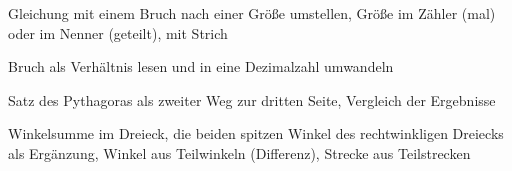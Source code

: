 \begin{aufgabe}{Gleichung mit einem Bruch nach einer Größe umstellen, Größe im Zähler (mal) oder im Nenner (geteilt), mit Strich}
\end{aufgabe}

\begin{aufgabe}{Bruch als Verhältnis lesen und in eine Dezimalzahl umwandeln}
\end{aufgabe}

\begin{aufgabe}{Satz des Pythagoras als zweiter Weg zur dritten Seite, Vergleich der Ergebnisse}
\end{aufgabe}

\begin{aufgabe}{Winkelsumme im Dreieck, die beiden spitzen Winkel des rechtwinkligen Dreiecks als Ergänzung, Winkel aus Teilwinkeln (Differenz), Strecke aus Teilstrecken}
\end{aufgabe}

